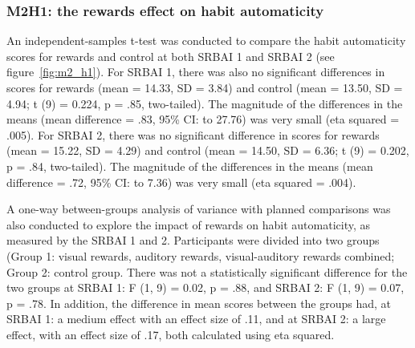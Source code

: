 \subsubsection*{M2H1: the rewards effect on habit automaticity}
An independent-samples t-test was conducted to compare the habit automaticity scores
for rewards and control at both SRBAI 1 and SRBAI 2 (see figure~\ref{fig:m2_h1}). For SRBAI 1, there was also no significant differences in scores for rewards (mean = 14.33, SD = 3.84) and control (mean = 13.50, SD = 4.94; t (9) = 0.224, p = .85,
two-tailed). The magnitude of the differences in the means (mean difference = .83,
95\% CI:  to 27.76) was very small (eta squared = .005). For SRBAI 2, there was no significant difference in scores for rewards
(mean = 15.22, SD = 4.29) and control (mean = 14.50, SD = 6.36; t (9) = 0.202, p = .84,
two-tailed). The magnitude of the differences in the means (mean difference = .72,
95\% CI:  to 7.36) was very small (eta squared = .004).


A one-way between-groups analysis of variance with planned comparisons was also conducted to explore the impact of rewards on habit automaticity, as measured by the SRBAI 1 and 2. Participants were divided into two groups (Group 1: visual rewards, auditory rewards, visual-auditory rewards combined; Group 2: control group. There was not a
statistically significant difference for the two groups at SRBAI 1: F (1, 9) = 0.02, p = .88, and SRBAI 2: F (1, 9) = 0.07, p = .78. In addition, the difference in mean scores between the groups had, at SRBAI 1: a medium effect with an effect size of .11, and at SRBAI 2: a large effect, with an effect size of .17, both calculated using eta squared.



